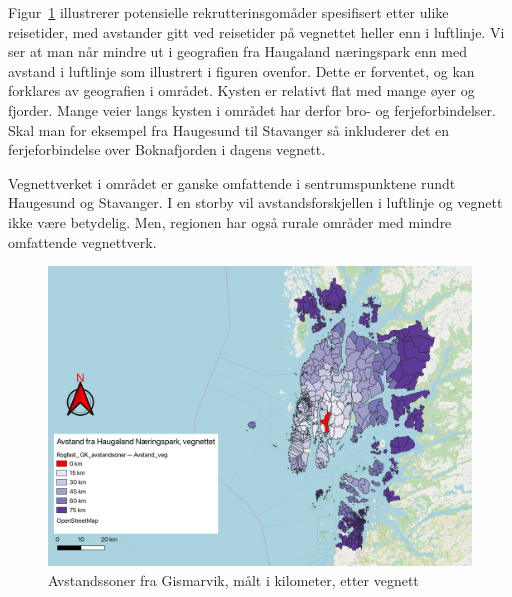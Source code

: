 \documentclass[
]{article}
\begin{document}
Figur~\ref{fig-avst-veg} illustrerer potensielle rekrutterinsgomåder
spesifisert etter ulike reisetider, med avstander gitt ved reisetider på
vegnettet heller enn i luftlinje. Vi ser at man når mindre ut i
geografien fra Haugaland næringspark enn med avstand i luftlinje som
illustrert i figuren ovenfor. Dette er forventet, og kan forklares av
geografien i området. Kysten er relativt flat med mange øyer og fjorder.
Mange veier langs kysten i området har derfor bro- og ferjeforbindelser.
Skal man for eksempel fra Haugesund til Stavanger så inkluderer det en
ferjeforbindelse over Boknafjorden i dagens vegnett.

Vegnettverket i området er ganske omfattende i sentrumspunktene rundt
Haugesund og Stavanger. I en storby vil avstandsforskjellen i luftlinje
og vegnett ikke være betydelig. Men, regionen har også rurale områder
med mindre omfattende vegnettverk.

\begin{figure}[H]

{\centering \includegraphics{bilder/Avstand_veg.png}

}

\caption{\label{fig-avst-veg}Avstandssoner fra Gismarvik, målt i
kilometer, etter vegnett}

\end{figure}
\end{document}
